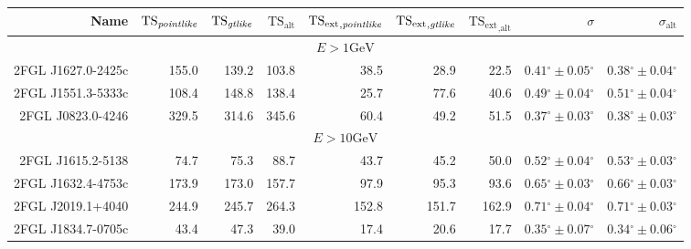 \documentclass[12pt,preprint]{aastex}
\newcommand{\gev}{\text{GeV}\xspace}
\newcommand{\tsext}{{\ensuremath{\text{TS}_\text{ext}}}\xspace}
\newcommand{\tsextpointlike}{\ensuremath{\tsext_{,\pointlike}}\xspace}
\newcommand{\tsextgtlike}{\ensuremath{\tsext_{,\gtlike}}\xspace}
\newcommand{\tsextalt}{\ensuremath{\tsext_{,\alt}}\xspace}
\newcommand{\ts}{\text{TS}\xspace}
\newcommand{\alt}{\text{alt}\xspace}
\renewcommand{\deg}{\ensuremath{^\circ}\xspace}
\newcommand{\pointlike}{\text{\em pointlike}\xspace}
\newcommand{\gtlike}{\text{\em gtlike}\xspace}
\begin{document}
  \clearpage
  \begin{table}
    \begin{centering}
      \begin{tabular}{r|rrrrrrrr}
        \hline
        \hline
        Name                 &     $\ts_\pointlike$ &        $\ts_\gtlike$ &           $\ts_\alt$ &          \tsextpointlike &           \tsextgtlike &            \tsextalt &                    $\sigma$ &               $\sigma_\alt$ \\
        \hline
        \multicolumn{9}{c}{$E > 1\gev$} \\
        \hline
        2FGL J1627.0-2425c   &                155.0 &                139.2 &                103.8 &                     38.5 &                   28.9 &                 22.5 & $  0.41\deg \pm   0.05\deg$ & $  0.38\deg \pm   0.04\deg$ \\
        2FGL J1551.3-5333c   &                108.4 &                148.8 &                138.4 &                     25.7 &                   77.6 &                 40.6 & $  0.49\deg \pm   0.04\deg$ & $  0.51\deg \pm   0.04\deg$ \\
        2FGL J0823.0-4246    &                329.5 &                314.6 &                345.6 &                     60.4 &                   49.2 &                 51.5 & $  0.37\deg \pm   0.03\deg$ & $  0.38\deg \pm   0.03\deg$ \\
        \hline
        \multicolumn{9}{c}{$E > 10\gev$} \\
        \hline
        2FGL J1615.2-5138    &                 74.7 &                 75.3 &                 88.7 &                     43.7 &                   45.2 &                 50.0 & $  0.52\deg \pm   0.04\deg$ & $  0.53\deg \pm   0.03\deg$ \\
        2FGL J1632.4-4753c   &                173.9 &                173.0 &                157.7 &                     97.9 &                   95.3 &                 93.6 & $  0.65\deg \pm   0.03\deg$ & $  0.66\deg \pm   0.03\deg$ \\
        2FGL J2019.1+4040    &                244.9 &                245.7 &                264.3 &                    152.8 &                  151.7 &                162.9 & $  0.71\deg \pm   0.04\deg$ & $  0.71\deg \pm   0.03\deg$ \\
        2FGL J1834.7-0705c   &                 43.4 &                 47.3 &                 39.0 &                     17.4 &                   20.6 &                 17.7 & $  0.35\deg \pm   0.07\deg$ & $  0.34\deg \pm   0.06\deg$ \\

\end{tabular}
\end{centering}
\end{table}
\end{document}
